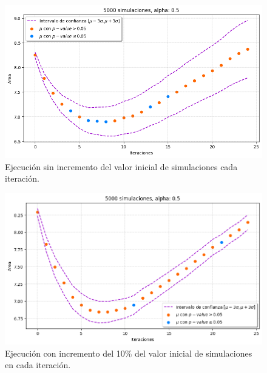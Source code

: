 \documentclass[../proyecto.tex]{memoir}
\begin{document}
\begin{figure}[H]
	\centering
    \includegraphics[width=\textwidth]{./images/iteracion_without_inc.png}
    \caption{Ejecución sin incremento del valor inicial de simulaciones cada iteración.}
    \label{fig:3-1}
\end{figure}

\begin{figure}[H]
        \centering
        \includegraphics[width=\textwidth]{./images/iteracion_inc.png}
        \caption{Ejecución con incremento del 10\% del valor inicial de simulaciones en cada iteración.}
        \label{fig:3-2}
\end{figure} 



\end{document}
